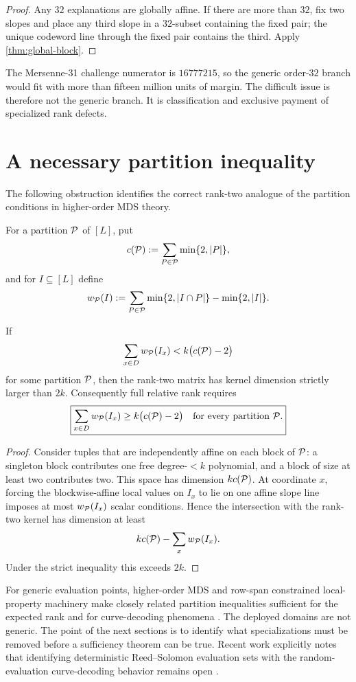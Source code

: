 \documentclass[11pt,a4paper]{amsart}
\numberwithin{equation}{section}
\theoremstyle{remark}
\begin{document}
\begin{proof}
Any $32$ explanations are globally affine.  If there are more than $32$, fix two slopes and place any third slope in a $32$-subset containing the fixed pair; the unique codeword line through the fixed pair contains the third.  Apply \cref{thm:global-block}.
\end{proof}

The Mersenne-31 challenge numerator is $16777215$, so the generic order-$32$ branch would fit with more than fifteen million units of margin.  The difficult issue is therefore not the generic branch.  It is classification and exclusive payment of specialized rank defects.

\section{A necessary partition inequality}

The following obstruction identifies the correct rank-two analogue of the partition conditions in higher-order MDS theory.

For a partition $\mathcal P$ of $[L]$, put
\[
 c(\mathcal P):=\sum_{P\in\mathcal P}\min\{2,|P|\},
\]
and for $I\subseteq[L]$ define
\[
 w_\mathcal P(I)
 :=\sum_{P\in\mathcal P}\min\{2,|I\cap P|\}-\min\{2,|I|\}.
\]

\begin{proposition}\label{prop:partition-obstruction}
If
\[
 \sum_{x\in D}w_\mathcal P(I_x)<k\bigl(c(\mathcal P)-2\bigr)
\]
for some partition $\mathcal P$, then the rank-two matrix has kernel dimension strictly larger than $2k$.
Consequently full relative rank requires
\[
 \boxed{
 \sum_{x\in D}w_\mathcal P(I_x)
 \ge k\bigl(c(\mathcal P)-2\bigr)
 \quad\text{for every partition }\mathcal P.
 }
\]
\end{proposition}

\begin{proof}
Consider tuples that are independently affine on each block of $\mathcal P$: a singleton block contributes one free degree-$<k$ polynomial, and a block of size at least two contributes two.  This space has dimension $kc(\mathcal P)$.  At coordinate $x$, forcing the blockwise-affine local values on $I_x$ to lie on one affine slope line imposes at most $w_\mathcal P(I_x)$ scalar conditions.  Hence the intersection with the rank-two kernel has dimension at least
\[
 kc(\mathcal P)-\sum_xw_\mathcal P(I_x).
\]
Under the strict inequality this exceeds $2k$.
\end{proof}

For generic evaluation points, higher-order MDS and row-span constrained local-property machinery make closely related partition inequalities sufficient for the expected rank and for curve-decoding phenomena \cite{BGM23,GGSW26}.  The deployed domains are not generic.  The point of the next sections is to identify what specializations must be removed before a sufficiency theorem can be true.  Recent work explicitly notes that identifying deterministic Reed--Solomon evaluation sets with the random-evaluation curve-decoding behavior remains open \cite{GGSW26}.
\end{document}
